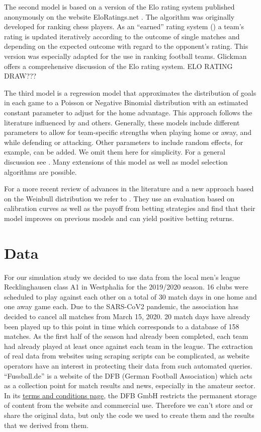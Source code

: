 \documentclass[12pt,a4paper]{article}
\begin{document}
The second model is based on a version of the Elo rating system
published anonymously on the website EloRatings.net
\autocite*{eloratings}. The algorithm was originally developed for
ranking chess players. As an \enquote{earned} rating system
(\textcite{lasek2013}) a team's rating is updated iteratively according
to the outcome of single matches and depending on the expected outcome
with regard to the opponent's rating. This version was especially
adapted for the use in ranking football teams. Glickman
\autocite*{glickman1995} offers a comprehensive discussion of the Elo
rating system. ELO RATING DRAW???

The third model is a regression model that approximates the distribution
of goals in each game to a Poisson or Negative Binomial distribution
with an estimated constant parameter to adjust for the home advantage.
This approach follows the literature influenced by \textcite{maher1982}
and others. Generally, these models include different parameters to
allow for team-specific strengths when playing home or away, and while
defending or attacking. Other parameters to include random effects, for
example, can be added. We omit them here for simplicity. For a general
discussion see \textcite{karlis2003}. Many extensions of this model as
well as model selection algorithms are possible.

For a more recent review of advances in the literature and a new
approach based on the Weinbull distribution we refer to
\textcite{boshnakov2017}. They use an evaluation based on calibration
curves as well as the payoff from betting strategies and find that their
model improves on previous models and can yield positive betting
returns.

\hypertarget{data}{%
\section{Data}\label{data}}

For our simulation study we decided to use data from the local men's
league Recklinghausen class A1 in Westphalia for the 2019/2020 season.
16 clubs were scheduled to play against each other on a total of 30
match days in one home and one away game each. Due to the SARS-CoV2
pandemic, the association has decided to cancel all matches from March
15, 2020. 20 match days have already been played up to this point in
time which corresponds to a database of 158 matches. As the first half
of the season had already been completed, each team had already played
at least once against each team in the league. The extraction of real
data from websites using scraping scripts can be complicated, as website
operators have an interest in protecting their data from such automated
queries. \enquote{Fussball.de} is a website of the DFB (German Football
Association) which acts as a collection point for match results and
news, especially in the amateur sector. In its
\href{http://www.fussball.de/terms.and.conditions\#!/}{terms and
conditions page}, the DFB GmbH restricts the permanent storage of
content from the website and commercial use. Therefore we can't store
and or share the original data, but only the code we used to create them
and the results that we derived from them.
\end{document}

